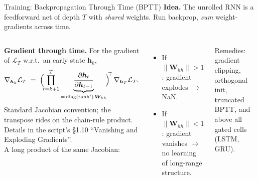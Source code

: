 \documentclass[aspectratio=169,11pt]{beamer}
\newcommand{\emphc}[1]{\textcolor{harvardcrimson}{#1}}
\newcommand{\W}{\bm{W}}
\begin{document}
\begin{frame}[shrink=10]{Training: Backpropagation Through Time (BPTT)}
\footnotesize
\textbf{Idea.}  The unrolled RNN is a feedforward net of depth $T$ with \emph{shared} weights.  Run backprop, \emph{sum} weight-gradients across time.

\vspace{3pt}
\begin{columns}[T]
\textbf{Gradient through time.} For the gradient of $\mathcal{L}_T$ w.r.t.\ an early state $\bm{h}_k$,
\[
\nabla_{\bm{h}_k}\mathcal{L}_T \;=\; \Bigl(\!\prod_{t=k+1}^{T} \underbrace{\frac{\partial \bm{h}_t}{\partial \bm{h}_{t-1}}}_{=\,\mathrm{diag}(\tanh')\,\W_{hh}}\!\Bigr)^{\!\!\top}\,\nabla_{\bm{h}_T}\mathcal{L}_T.
\]
{\scriptsize Standard Jacobian convention; the transpose rides on the chain-rule product. Details in the script's \S1.10 ``Vanishing and Exploding Gradients''.}\\[1pt]
A \emphc{long product of the same Jacobian}:
\begin{itemize}\itemsep0pt
    \item If $\|\W_{hh}\|\!>\!1$: gradient \emphc{explodes} $\to$ NaN.
    \item If $\|\W_{hh}\|\!<\!1$: gradient \emphc{vanishes} $\to$ no learning of long-range structure.
\end{itemize}

\vspace{1pt}
{\scriptsize\emphc{Remedies:} gradient clipping, orthogonal init, truncated BPTT, and above all \emphc{gated cells} (LSTM, GRU).}

\centering
{}
\end{columns}
\end{frame}
\end{document}
